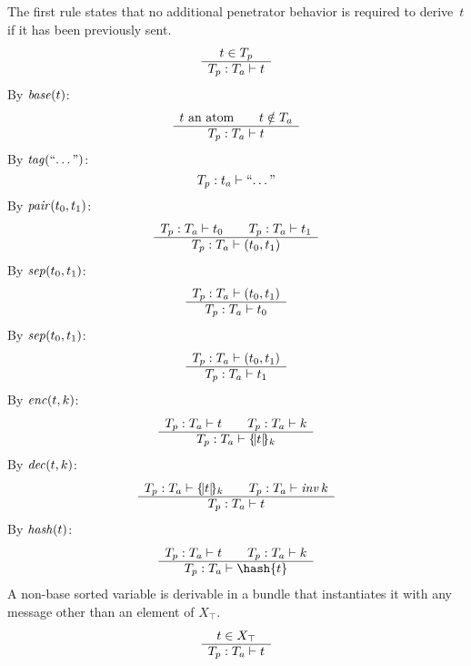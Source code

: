 \documentclass[12pt]{report}
\theoremstyle{definition}
\begin{document}
The first rule states that no additional penetrator behavior is required
to derive~$t$ if it has been previously sent.
\begin{equation}
  \infer{t\in{T_p}}{\der{t}{T_p}{T_a}}
\end{equation}
%
By $\fn{base}(t)$:
\begin{equation}\label{eqn:base}
  \infer{\mbox{$t$ an atom}\qquad t\notin T_a}{\der{t}{T_p}{T_a}}
\end{equation}
%
By $\fn{tag}(\mbox{``\ldots''})$:
\begin{equation}\label{eqn:tag}
  \der{\mbox{``\ldots''}}{T_p}{t_a}
\end{equation}
%
By $\fn{pair}(t_0,t_1)$:
\begin{equation}\label{eqn:pair}
  \infer{\der{t_0}{T_p}{T_a}\qquad\der{t_1}{T_p}{T_a}}
        {\der{(t_0,t_1)}{T_p}{T_a}}
\end{equation}
%
By $\fn{sep}(t_0,t_1)$:
\begin{equation}\label{eqn:sep0}
  \infer{\der{(t_0,t_1)}{T_p}{T_a}}{\der{t_0}{T_p}{T_a}}
\end{equation}
%
By $\fn{sep}(t_0,t_1)$:
\begin{equation}\label{eqn:sep1}
  \infer{\der{(t_0,t_1)}{T_p}{T_a}}{\der{t_1}{T_p}{T_a}}
\end{equation}
%
By $\fn{enc}(t,k)$:
\begin{equation}\label{eqn:enc}
  \infer{\der{t}{T_p}{T_a}\qquad\der{k}{T_p}{T_a}}{\der{\enc{t}{k}}{T_p}{T_a}}
\end{equation}
%
By $\fn{dec}(t,k)$:
\begin{equation}\label{eqn:dec}
  \infer{\der{\enc{t}{k}}{T_p}{T_a}\qquad\der{\fn{inv}{k}}{T_p}{T_a}}{\der{t}{T_p}{T_a}}
\end{equation}
%
By $\fn{hash}(t)$:
\begin{equation}\label{eqn:hash}
  \infer{\der{t}{T_p}{T_a}\qquad\der{k}{T_p}{T_a}}{\der{\hash{t}}{T_p}{T_a}}
\end{equation}
%
A non-base sorted variable is derivable in a bundle that instantiates
it with any message other than an element of $X_\top$.
\begin{equation}\label{eqn:top}
  \infer{t\in X_\top}{\der{t}{T_p}{T_a}}
\end{equation}
\end{document}
